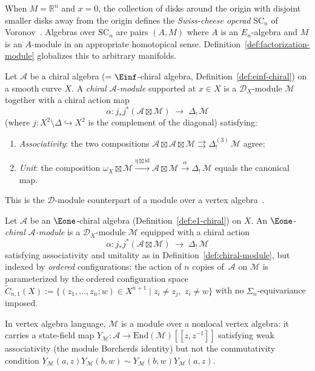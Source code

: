 \begin{remark}\label{rem:swiss-cheese}
When $M = \mathbb{R}^n$ and $x = 0$, the collection of disks around the
origin with disjoint smaller disks away from the origin defines the
\emph{Swiss-cheese operad} $\mathrm{SC}_n$ of
Voronov~\cite{Voronov99}.  Algebras over $\mathrm{SC}_n$ are pairs
$(A, M)$ where $A$ is an $E_n$-algebra and $M$ is an $A$-module in
an appropriate homotopical sense.
Definition~\ref{def:factorization-module} globalizes this to arbitrary manifolds.
\end{remark}

\begin{definition}\label{def:chiral-module}
Let $\mathcal{A}$ be a chiral algebra (= $\Einf$-chiral algebra,
Definition~\ref{def:einf-chiral}) on a smooth curve $X$.  A
\emph{chiral $\mathcal{A}$-module} supported at $x \in X$ is a
$\mathcal{D}_X$-module $\mathcal{M}$ together with a chiral action map
\[
\alpha: j_* j^*(\mathcal{A} \boxtimes \mathcal{M})
\;\longrightarrow\; \Delta_!\, \mathcal{M}
\]
(where $j: X^2 \setminus \Delta \hookrightarrow X^2$ is the complement
of the diagonal) satisfying:
\begin{enumerate}[label=(\roman*)]
\item \emph{Associativity}: the two compositions
   $\mathcal{A} \boxtimes \mathcal{A} \boxtimes \mathcal{M}
   \rightrightarrows \Delta^{(3)}_!\,\mathcal{M}$ agree;
\item \emph{Unit}: the composition
   $\omega_X \boxtimes \mathcal{M} \xrightarrow{\eta \boxtimes
   \mathrm{id}} \mathcal{A} \boxtimes \mathcal{M}
   \xrightarrow{\alpha} \Delta_!\,\mathcal{M}$
   equals the canonical map.
\end{enumerate}
This is the $\mathcal{D}$-module counterpart of a module over a vertex
algebra~\cite[\S3.6]{BD04}.
\end{definition}

\begin{definition}\label{def:e1-chiral-module}
Let $\mathcal{A}$ be an $\Eone$-chiral algebra
(Definition~\ref{def:e1-chiral}) on $X$.  An \emph{$\Eone$-chiral
$\mathcal{A}$-module} is a $\mathcal{D}_X$-module $\mathcal{M}$
equipped with a chiral action
\[
\alpha: j_* j^*(\mathcal{A} \boxtimes \mathcal{M})
\;\longrightarrow\; \Delta_!\, \mathcal{M}
\]
satisfying associativity and unitality as in
Definition~\ref{def:chiral-module}, but indexed by \emph{ordered}
configurations: the action of $n$ copies of~$\mathcal{A}$ on
$\mathcal{M}$ is parameterized by the ordered configuration space
$\widetilde{C}_{n,1}(X) := \{(z_1, \ldots, z_n; w) \in X^{n+1}
\mid z_i \neq z_j,\; z_i \neq w\}$
with no $\Sigma_n$-equivariance imposed.

In vertex algebra language, $\mathcal{M}$ is a module over a nonlocal
vertex algebra: it carries a state-field map
$Y_{\mathcal{M}}: \mathcal{A} \to \mathrm{End}(\mathcal{M})[[z, z^{-1}]]$
satisfying weak associativity (the module Borcherds identity) but not
the commutativity condition
$Y_{\mathcal{M}}(a,z) Y_{\mathcal{M}}(b,w) \sim
Y_{\mathcal{M}}(b,w) Y_{\mathcal{M}}(a,z)$.
\end{definition}

